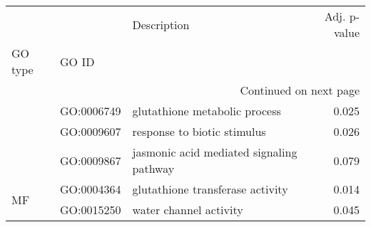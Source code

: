\begin{longtable}{lllr}
\toprule
   &            &                               Description &  Adj. p-value \\
GO type & GO ID &                                           &               \\
\midrule
\endhead
\midrule
\multicolumn{4}{r}{{Continued on next page}} \\
\midrule
\endfoot

\bottomrule
\endlastfoot
\multirow{3}{*}{BP} & GO:0006749 &             glutathione metabolic process &         0.025 \\
   & GO:0009607 &               response to biotic stimulus &         0.026 \\
   & GO:0009867 &  jasmonic acid mediated signaling pathway &         0.079 \\
\cline{1-4}
\multirow{2}{*}{MF} & GO:0004364 &          glutathione transferase activity &         0.014 \\
   & GO:0015250 &                    water channel activity &         0.045 \\
\end{longtable}
